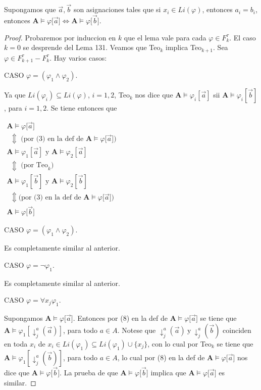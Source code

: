   \begin{lemma} \label{lemma_45}
    \PN Supongamos que $\vec{a}, \vec{b}$ son asignaciones tales que si $x_{i} \in Li(\varphi)$, entonces $a_{i} =
    b_{i}$, entonces $\mathbf{A} \models \varphi \lbrack \vec{a}] \Leftrightarrow \mathbf{A} \models \varphi \lbrack
    \vec{b}]$.
  \end{lemma}
  \begin{proof}
    Probaremos por induccion en $k$ que el lema vale para cada $\varphi \in F_{k}^{\tau }.$ El caso $k=0$ se desprende del Lema 131. Veamos que Teo$_{k}$ implica Teo$_{k+1}.$ Sea $\varphi \in F_{k+1}^{\tau }-F_{k}^{\tau }.$ Hay varios casos:

    CASO $\varphi = (\varphi_{1}\wedge \varphi_{2})$.

    Ya que $Li(\varphi_{i})\subseteq Li(\varphi )$, $i=1,2$, Teo$_{k}$ nos dice que $\mathbf{A} \models \varphi_{i}[\vec{a}]$ sii $\mathbf{A} \models \varphi_{i}[\vec{b}]$, para $i=1,2$. Se tiene entonces que

    $\displaystyle \begin{array}{l} \mathbf{A} \models \varphi \lbrack \vec{a}] \\ \ \ \Updownarrow \text{ (por (3) en la def de }\mathbf{A} \models \varphi \lbrack \vec{a}]\text{)} \\ \mathbf{A} \models \varphi_{1}[\vec{a}]\text{ y }\mathbf{A} \models \varphi_{2}[\vec{a}] \\ \ \ \Updownarrow \text{ (por Teo}_{k}\text{)} \\ \mathbf{A} \models \varphi_{1}[\vec{b}]\text{ y }\mathbf{A} \models \varphi_{2}[\vec{b}] \\ \ \ \Updownarrow \text{(por (3) en la def de }\mathbf{A} \models \varphi \lbrack \vec{a}]\text{)} \\ \mathbf{A} \models \varphi \lbrack \vec{b}] \end{array} $

    CASO $\varphi = (\varphi_{1}\wedge \varphi_{2})$.

    Es completamente similar al anterior.

    CASO $\varphi =\lnot \varphi_{1}.$

    Es completamente similar al anterior.

    CASO $\varphi =\forall x_{j}\varphi_{1}.$

    Supongamos $\mathbf{A} \models \varphi \lbrack \vec{a}]$. Entonces por (8) en la def de $\mathbf{A} \models \varphi \lbrack \vec{a}]$ se tiene que $\mathbf{A} \models \varphi_{1}[\downarrow _{j}^{a}(\vec{a})]$, para todo $a\in A$. Notese que $\downarrow _{j}^{a}(\vec{a}) \ \text{y} \ \downarrow _{j}^{a}(\vec{b})$ coinciden en toda $x_{i}$ de $x_{i}\in Li(\varphi_{1})\subseteq Li(\varphi_{1})\cup \{x_{j}\}$, con lo cual por Teo$_{k}$ se tiene que $\mathbf{A} \models \varphi_{1}[\downarrow _{j}^{a}(\vec{b})]$, para todo $a\in A$, lo cual por (8) en la def de $\mathbf{A} \models \varphi \lbrack \vec{a}]$ nos dice que $\mathbf{A} \models \varphi \lbrack \vec{b}]$. La prueba de que $\mathbf{A} \models \varphi \lbrack \vec{b}]$ implica que $ \mathbf{A} \models \varphi \lbrack \vec{a}]$ es similar.


\end{proof}
